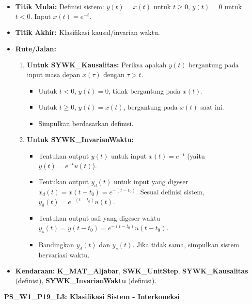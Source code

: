 \documentclass[
  letterpaper,
  DIV=11,
  numbers=noendperiod]{scrreprt}
\providecommand{\tightlist}{%
  \setlength{\itemsep}{0pt}\setlength{\parskip}{0pt}}
\begin{document}
\begin{itemize}
\tightlist
\item
  \textbf{Titik Mulai:} Definisi sistem: \(y(t) = x(t)\) untuk
  \(t \ge 0\), \(y(t) = 0\) untuk \(t < 0\). Input \(x(t) = e^{-t}\).
\item
  \textbf{Titik Akhir:} Klasifikasi kausal/invarian waktu.
\item
  \textbf{Rute/Jalan:}

  \begin{enumerate}
  \def\labelenumi{\arabic{enumi}.}
  \tightlist
  \item
    \textbf{Untuk SYWK\_Kausalitas:} Periksa apakah \(y(t)\) bergantung
    pada input masa depan \(x(\tau)\) dengan \(\tau > t\).

    \begin{itemize}
    \tightlist
    \item
      Untuk \(t < 0\), \(y(t)=0\), tidak bergantung pada \(x(t)\).
    \item
      Untuk \(t \ge 0\), \(y(t)=x(t)\), bergantung pada \(x(t)\) saat
      ini.
    \item
      Simpulkan berdasarkan definisi.
    \end{itemize}
  \item
    \textbf{Untuk SYWK\_InvarianWaktu:}

    \begin{itemize}
    \tightlist
    \item
      Tentukan output \(y(t)\) untuk input \(x(t) = e^{-t}\) (yaitu
      \(y(t) = e^{-t} u(t)\)).
    \item
      Tentukan output \(y_d(t)\) untuk input yang digeser
      \(x_d(t) = x(t-t_0) = e^{-(t-t_0)}\). Sesuai definisi sistem,
      \(y_d(t) = e^{-(t-t_0)} u(t)\).
    \item
      Tentukan output asli yang digeser waktu
      \(y_s(t) = y(t-t_0) = e^{-(t-t_0)} u(t-t_0)\).
    \item
      Bandingkan \(y_d(t)\) dan \(y_s(t)\). Jika tidak sama, simpulkan
      sistem bervariasi waktu.
    \end{itemize}
  \end{enumerate}
\item
  \textbf{Kendaraan:} \textbf{K\_MAT\_Aljabar}, \textbf{SWK\_UnitStep},
  \textbf{SYWK\_Kausalitas} (definisi), \textbf{SYWK\_InvarianWaktu}
  (definisi).
\end{itemize}

\textbf{PS\_W1\_P19\_L3: Klasifikasi Sistem - Interkoneksi}
\end{document}
